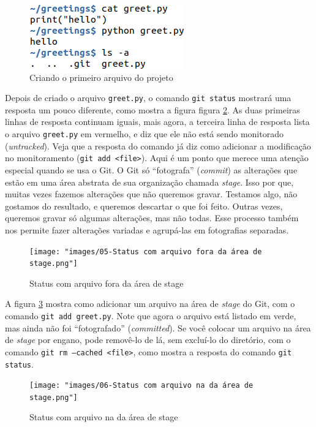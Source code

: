 \documentclass[a4paper]{book}
\begin{document}
\begin{figure}[ht]
\caption{Criando o primeiro arquivo do projeto}
\label{fig:04}
\centering
\includegraphics[scale=0.6]{"images/04-Criando o primeiro arquivo do projeto.png"}
\end{figure}

Depois de criado o arquivo \texttt{greet.py}, o comando
\texttt{git status} mostrará uma resposta um pouco diferente,
como mostra a figura figura \ref{fig:05}.
As duas primeiras linhas de resposta continuam iguais,
mais agora, a terceira linha de resposta lista o arquivo
\texttt{greet.py} em vermelho, e diz que ele não está
sendo monitorado (\textit{untracked}).
Veja que a resposta do comando já diz como adicionar
a modificação no monitoramento (\texttt{git add <file>}).
Aqui é um ponto que merece uma atenção especial quando se usa o Git.
O Git só ``fotografa'' (\textit{commit}) as alterações que estão
em uma área abstrata de sua organização chamada \textit{stage}.
Isso por que, muitas vezes fazemos alterações que não queremos 
gravar. Testamos algo, não gostamos do resultado, e queremos descartar
o que foi feito. Outras vezes, queremos gravar só algumas alterações,
mas não todas. 
Esse processo também nos permite fazer alterações variadas e 
agrupá-las em fotografias separadas.

\begin{figure}[ht]
\caption{Status com arquivo fora da área de stage}
\label{fig:05}
\centering
\texttt{[image: "images/05-Status com arquivo fora da área de stage.png"]}
\end{figure}

A figura \ref{fig:06} mostra como adicionar um arquivo na área de 
\textit{stage} do Git, com o comando \texttt{git add greet.py}.
Note que agora o arquivo está listado em verde, mas ainda não foi
``fotografado'' (\textit{committed}).
Se você colocar um arquivo na área de \textit{stage} por engano,
pode removê-lo de lá, sem excluí-lo do diretório, com o 
comando \texttt{git rm --cached <file>}, como mostra a resposta 
do comando \texttt{git status}.

\begin{figure}[ht]
\caption{Status com arquivo na da área de stage}
\label{fig:06}
\centering
\texttt{[image: "images/06-Status com arquivo na da área de stage.png"]}
\end{figure}
\end{document}
